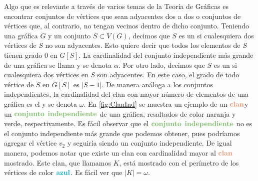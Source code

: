     Algo que es relevante a trav\'es de varios temas de la Teor\'ia de
    Gr\'aficas es encontrar conjuntos de v\'ertices que sean adyacentes dos a
    dos o conjuntos de v\'ertices que, al contrario, no tengan vecinos dentro de
    dicho conjunto. Teniendo una gr\'afica $G$ y un conjunto $S \subset V(G)$,
    decimos que $S$ es un  si cualesquiera dos
    v\'ertices de $S$ no son adyacentes. Esto quiere decir que todos los
    elementos de $S$ tienen grado $0$ en $G[S]$. La cardinalidad del conjunto
    independiente m\'as grande de una gr\'afica se llama  y se denota $\alpha$. Por otro lado, decimos que $S$ es un
     si cualesquiera dos v\'ertices en $S$ son adyacentes. En este
    caso, el grado de todo v\'ertice de $S$ en $G[S]$ es $|S-1|$. De manera
    an\'aloga a los conjuntos independientes, la cardinalidad del clan con mayor
    n\'umero de elementos de una gr\'afica es el  y se
    denota $\omega$. En \cref{fig:ClanInd} se muestra un ejemplo de un
    ${\color{coral}\bf clan}$y un ${\color{verde}\bf conjunto}$
    ${\color{verde}\bf independiente}$ de una gr\'afica, resaltados de color
    naranja y verde, respectivamente. Es f\'acil observar que el
    ${\color{verde}\bf conjunto}$ ${\color{verde}\bf independiente}$ no es el
    conjunto independiente m\'as grande que podemos obtener, pues podr\'iamos
    agregar el v\'ertice $v_2$ y seguir\'ia siendo un conjunto independiente. De
    igual manera, podemos notar que existe un clan con cardinalidad mayor al
    ${\color{coral}\bf clan}$ mostrado. Este clan, que llamamos $K$, est\'a
    mostrado con el per\'imetro de los v\'ertices de color
    ${\color{azulCielo}\bf azul}$. Es f\'acil ver que $|K| = \omega$.


